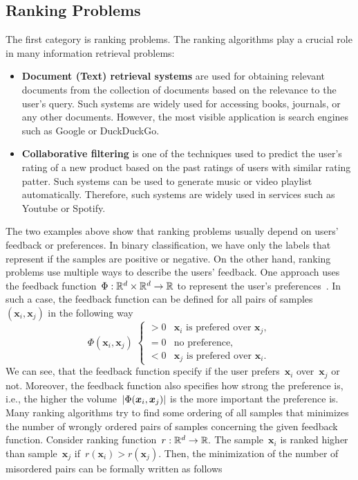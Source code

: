 \subsection{Ranking Problems}

The first category is ranking problems. The ranking algorithms play a crucial role in many information retrieval problems:
\begin{itemize}
  \item \textbf{Document (Text) retrieval systems} are used for obtaining relevant documents from the collection of documents based on the relevance to the user's query. Such systems are widely used for accessing books, journals, or any other documents. However, the most visible application is search engines such as Google or DuckDuckGo.
  \item \textbf{Collaborative filtering} is one of the techniques used to predict the user's rating of a new product based on the past ratings of users with similar rating patter. Such systems can be used to generate music or video playlist automatically. Therefore, such systems are widely used in services such as Youtube or Spotify.
\end{itemize}
The two examples above show that ranking problems usually depend on users' feedback or preferences. In binary classification, we have only the labels that represent if the samples are positive or negative. On the other hand, ranking problems use multiple ways to describe the users' feedback. One approach uses the feedback function~$\Phi: \mathbb{R}^d \times \mathbb{R}^d \to \mathbb{R}$ to represent the user's preferences~\cite{freund2003efficient}. In such a case, the feedback function can be defined for all pairs of samples~$(\bm{x}_i, \bm{x}_j)$ in the following way
\begin{equation*}
  \Phi(\bm{x}_i, \bm{x}_j) \; 
  \begin{cases}
    > 0 & \bm{x}_i \text{ is prefered over } \bm{x}_j, \\
    = 0 & \text{no preference,} \\
    < 0 & \bm{x}_j \text{ is prefered over } \bm{x}_i.
  \end{cases}
\end{equation*}
We can see, that the feedback function specify if the user prefers~$\bm{x}_i$ over~$\bm{x}_j$ or not. Moreover, the feedback function also specifies how strong the preference is, i.e., the higher the volume~$|\Phi(\bm{x}_i, \bm{x}_j)|$ is the more important the preference is. Many ranking algorithms try to find some ordering of all samples that minimizes the number of wrongly ordered pairs of samples concerning the given feedback function. Consider ranking function~$r: \mathbb{R}^d \to \mathbb{R}.$ The sample~$\bm{x}_i$ is ranked higher than sample~$\bm{x}_j$ if~$r(\bm{x}_i) > r(\bm{x}_j).$ Then, the minimization of the number of misordered pairs can be formally written as follows
